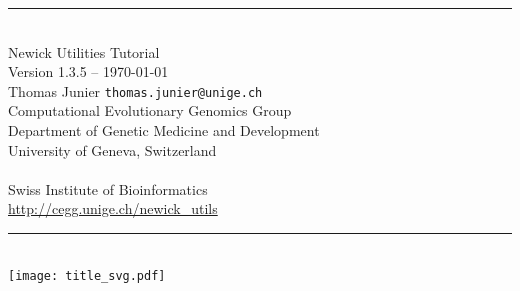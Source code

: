 \documentclass[a4paper,10pt]{report}
\newcommand{\Hrule}[1]{\rule{\linewidth}{#1}}
\begin{document}
\nobibliography*

\begin{titlepage}
\begin{center}
\Hrule{0.5mm} \\[0.8cm]
{\Huge Newick Utilities Tutorial} \\[0.5cm]
Version 1.3.5 -- \today \\
\medskip
Thomas Junier \texttt{thomas.junier@unige.ch} \\
Computational Evolutionary Genomics Group \\
Department of Genetic Medicine and Development \\
University of Geneva, Switzerland \\
   \\
Swiss Institute of Bioinformatics \\
\medskip
\url{http://cegg.unige.ch/newick_utils}
\Hrule{0.5mm}
\\[2cm]
\texttt{[image: title\_svg.pdf]}
\end{center}
\end{titlepage}

\tableofcontents











\appendix










% 

% 
\end{document}
